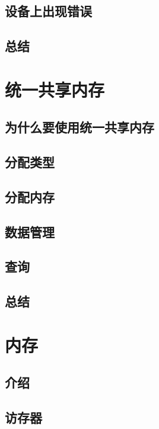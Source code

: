 \documentclass[11pt,a4paper,UTF8]{ctexart}
\begin{document}
		\subsection{设备上出现错误}
		
		\subsection{总结}
		
	\section{统一共享内存}
	
		\subsection{为什么要使用统一共享内存}
		
		\subsection{分配类型}
		
		\subsection{分配内存}
		
		\subsection{数据管理}
		
		\subsection{查询}
		
		\subsection{总结}
		
	\section{内存}
	
		\subsection{介绍}
		
		\subsection{访存器}
		
\end{document}
